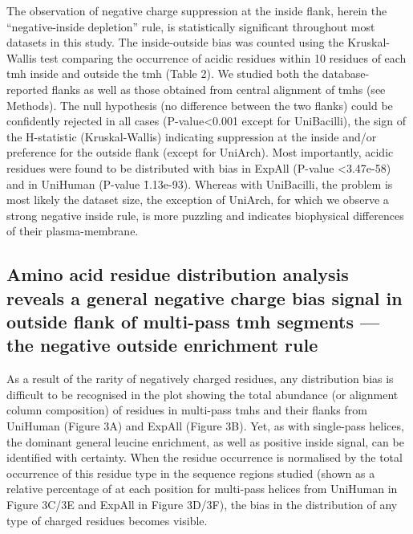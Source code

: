The observation of negative charge suppression at the inside flank, herein the “negative-inside depletion” rule, is statistically significant throughout most datasets in this study. The inside-outside bias was counted using the Kruskal-Wallis test comparing the occurrence of acidic residues within 10 residues of each \gls{tmh} inside and outside the \gls{tmh} (Table 2). We studied both the database-reported flanks as well as those obtained from central alignment of \gls{tmh}s (see Methods). The null hypothesis (no difference between the two flanks) could be confidently rejected in all cases (P-value<0.001 except for UniBacilli), the sign of the H-statistic (Kruskal-Wallis) indicating suppression at the inside and/or preference for the outside flank (except for UniArch). Most importantly, acidic residues were found to be distributed with bias in ExpAll (P-value <3.47e-58) and in UniHuman (P-value \= 1.13e-93). Whereas with UniBacilli, the problem is most likely the dataset size, the exception of UniArch, for which we observe a strong negative inside rule, is more puzzling and indicates biophysical differences of their plasma-membrane.

\subsection{Amino acid residue distribution analysis reveals a general negative charge bias signal in outside flank of multi-pass \gls{tmh} segments --- the negative outside enrichment rule}

As a result of the rarity of negatively charged residues, any distribution bias is difficult to be recognised in the plot showing the total abundance (or alignment column composition) of residues in multi-pass \gls{tmh}s and their flanks from UniHuman (Figure 3A) and ExpAll (Figure 3B). Yet, as with single-pass helices, the dominant general leucine enrichment, as well as positive inside signal, can be identified with certainty. When the residue occurrence is normalised by the total occurrence of this residue type in the sequence regions studied (shown as a relative percentage of at each position for multi-pass helices from UniHuman in Figure 3C/3E and ExpAll in Figure 3D/3F), the bias in the distribution of any type of charged residues becomes visible.

